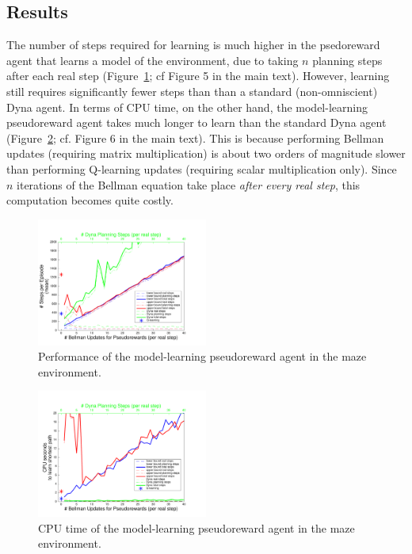 \documentclass[letterpaper]{article}
\begin{document}
\subsection{Results}


The number of steps required for learning is much higher in the psedoreward agent that learns a model of the environment, due to taking $n$ planning steps after each real step (Figure~\ref{fig:S3a}; cf Figure 5 in the main text). However, learning still requires significantly fewer steps than than a standard (non-omniscient) Dyna agent. In terms of CPU time, on the other hand, the model-learning pseudoreward agent takes much longer to learn than the standard Dyna agent (Figure~\ref{fig:S3b}; cf. Figure 6 in the main text). This is because performing Bellman updates (requiring matrix multiplication) is about two orders of magnitude slower than performing Q-learning updates (requiring scalar multiplication only). Since $n$ iterations of the Bellman equation take place \textit{after every real step}, this computation becomes quite costly.

\begin{figure}[ht]
\centering
\includegraphics[width=0.5\textwidth]{learning_vs_PRiterationsLearnMod_DYNA_mean}
\caption{Performance of the model-learning pseudoreward agent in the maze environment.}
\label{fig:S3a}
\end{figure}

\begin{figure}[ht]
\centering
\includegraphics[width=0.5\textwidth]{cpus_vs_PRiterationsLearnMod_DYNA_toGoal}
\caption{CPU time of the model-learning pseudoreward agent in the maze environment.}
\label{fig:S3b}
\end{figure}
\end{document}
